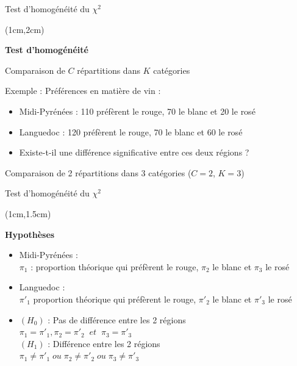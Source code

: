 \documentclass{beamer}
\begin{document}
\begin{frame}{Test d'homogénéité du $\chi^2$}
\begin{textblock*}{\textwidth}(1cm,2cm)

\begin{center}{\bf \Large Test d'homogénéité } \end{center}
\begin{center}
Comparaison de $C$ répartitions dans $K$ catégories \end{center}

\vspace{0.5cm}
Exemple : Préférences en matière de vin :

\begin{itemize}
\item  Midi-Pyrénées :  110  préfèrent le rouge, 
70  le blanc et 20  le rosé
\item Languedoc :  120  préfèrent le rouge, 
70  le blanc et 60  le rosé
\item Existe-t-il une différence significative entre ces deux régions ?\\
\end{itemize}
\vspace{0.5cm}
Comparaison de 2 répartitions dans 3 catégories ($C=2$, $K=3$)

\end{textblock*}

\end{frame}



\begin{frame}{Test d'homogénéité du $\chi^2$}
\begin{textblock*}{\textwidth}(1cm,1.5cm)

\begin{center}{\bf \Large Hypothèses} \end{center}

\begin{itemize}
\item  Midi-Pyrénées : \\
$\pi_1$ : proportion théorique qui préfèrent le rouge, $\pi_2$  le blanc et $\pi_3$  le rosé
\item Languedoc : \\
$\pi'_1$ proportion théorique qui préfèrent le rouge, $\pi'_2$  le blanc et $\pi'_3$ le rosé \\
\vspace{0.5cm}
\item $(H_0)$ : Pas de différence entre les 2 régions\\ 
$\pi_1=\pi'_1, \pi_2=\pi'_2 \;\; et \;\; \pi_3=\pi'_3$ \\
\vspace{0.2cm}
$(H_1)$ : Différence entre les 2 régions \\
$\pi_1\neq\pi'_1 \; ou \; \pi_2\neq\pi'_2 \; ou \; \pi_3\neq\pi'_3$\\
\end{itemize}

\end{textblock*}

\end{frame}
\end{document}
